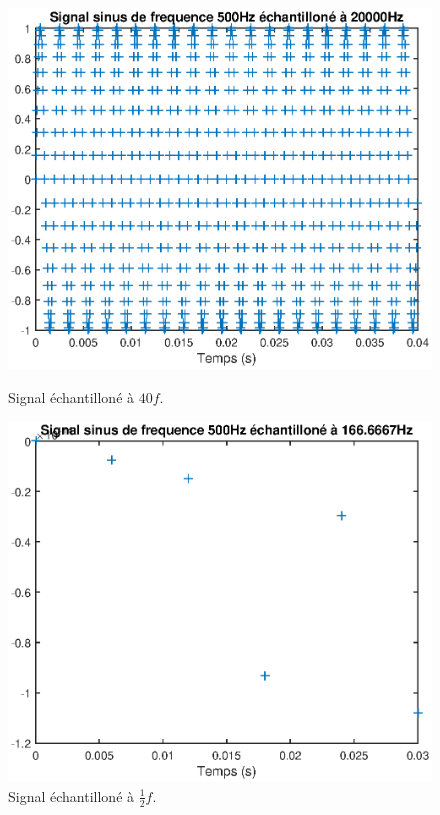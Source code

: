 \documentclass[french]{article}
\begin{document}
\begin{figure}[h!]
\begin{minipage}{0.45\textwidth}
	\end{minipage}
	\begin{minipage}{0.45\textwidth}
	\centering
	\includegraphics[width=\textwidth]{images/echantillone_2.eps}
	\caption{Signal échantilloné à $40f$.}
	\label{fig:echantillon2}
	\end{minipage}
	\begin{minipage}{0.5\textwidth}
	\centering
	\includegraphics[width=\textwidth]{images/echantillone_3.eps}
	\caption{Signal échantilloné à $\frac{1}{2}f$.}
	\label{fig:echantillon3}
	\end{minipage}
\end{figure}
\end{document}
